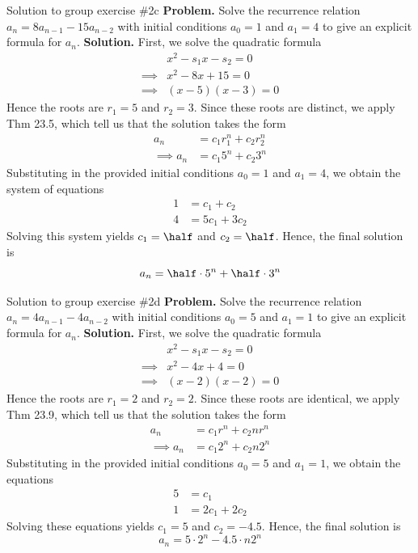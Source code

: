 \documentclass[10pt]{beamer}
\begin{document}
\begin{frame}{Solution to group exercise \#2c}
\footnotesize
\colorbox{red!30}{\textbf{Problem.}} Solve the recurrence relation $a_n = 8 a_{n-1} - 15a_{n-2}$  with initial conditions $a_0=1$ and $a_1=4$ to give an explicit formula for $a_n$. 
\vfill  \vfill 
\colorbox{green!30}{\textbf{Solution.}} First, we solve the quadratic formula 
%
\begin{align*}
& x^2 - s_1 x - s_2 =0  \\
\implies & x^2 - 8 x + 15 =0  \\
\implies & (x-5)(x-3) =0  
\end{align*}
%
Hence the roots are $r_1=5$ and $r_2=3$.  Since these roots are distinct, we apply Thm 23.5, which tell us that the solution takes the form 
%
\begin{align*}
a_n &= c_1 r_1^n + c_2 r_2^n \\
\implies a_n &= c_1 5^n + c_2 3^n 
\end{align*}
%
Substituting in the provided initial conditions  $a_0=1$ and $a_1=4$, we obtain the system of equations
%
\begin{align*}
1 &= c_1 + c_2 \\
4 &= 5c_1 + 3c_2
\end{align*}
%
Solving this system yields $c_1 = \half$ and $c_2 = \half$.  Hence, the final solution is
\[ a_n = \half \cdot  5^n + \half \cdot 3^n  \]


\end{frame}

\begin{frame}{Solution to group exercise \#2d}
\footnotesize
\colorbox{red!30}{\textbf{Problem.}} Solve the recurrence relation $a_n = 4 a_{n-1} -4 a_{n-2}$  with initial conditions $a_0=5$ and $a_1=1$ to give an explicit formula for $a_n$. 
\vfill  \vfill 
\colorbox{green!30}{\textbf{Solution.}} First, we solve the quadratic formula 
%
\begin{align*}
& x^2 - s_1 x - s_2 =0  \\
\implies & x^2 - 4 x + 4 =0  \\
\implies & (x-2)(x-2) =0  
\end{align*}
%
Hence the roots are $r_1=2$ and $r_2=2$.  Since these roots are identical, we apply Thm 23.9, which tell us that the solution takes the form 
%
\begin{align*}
a_n &= c_1 r^n + c_2 n r^n \\
\implies a_n &= c_1 2^n + c_2 n 2^n 
\end{align*}
%
Substituting in the provided initial conditions  $a_0=5$ and $a_1=1$, we obtain the equations
%
\begin{align*}
5 &= c_1  \\
1 &= 2c_1 + 2c_2
\end{align*}
%
Solving these equations yields $c_1 = 5$ and $c_2 = -4.5$.  Hence, the final solution is
\[ a_n = 5 \cdot  2^n -4.5 \cdot n 2^n  \]


\end{frame}
\end{document}
